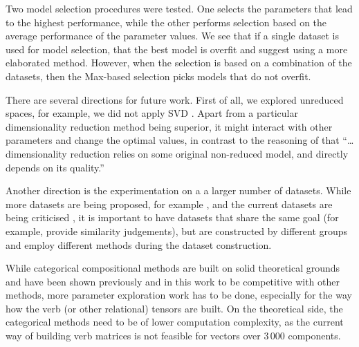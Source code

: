 \documentclass[11pt,a4paper,english,oneside]{book}
\newcommand\newcite\citet
\renewcommand\cite\citep
\begin{document}
Two model selection procedures were tested. One selects the parameters that lead to the highest performance, while the other performs selection based on the average performance of the parameter values. We see that if a single dataset is used for model selection, that the best model is overfit and suggest using a more elaborated method. However, when the selection is based on a combination of the datasets, then the Max-based selection picks models that do not overfit.

There are several directions for future work. First of all, we explored unreduced spaces, for example, we did not apply SVD \cite{BullinariaLevy2012}. Apart from a particular dimensionality reduction method being superior, it might interact with other parameters \cite{lapesa2014large} and change the optimal values, in contrast to the reasoning of \newcite{kiela-clark:2014:CVSC} that ``\ldots dimensionality reduction relies on some original non-reduced model, and directly depends on its quality.''

Another direction is the experimentation on a a larger number of datasets. While more datasets are being proposed, for example \newcite{2016arXiv160800869G}, and the current datasets are being criticised \cite{RepEval:2016}, it is important to have datasets that share the same goal (for example, provide similarity judgements), but are constructed by different groups and employ different methods during the dataset construction.

While categorical compositional methods are built on solid theoretical grounds \cite{DBLP:journals/corr/abs-1003-4394} and have been shown previously \cite{Grefenstette:2011:ETV:2140490.2140497,kartsadrqpl2014,fried-polajnar-clark:2015:ACL-IJCNLP,kim2015neural,hashimoto-tsuruoka:2016:P16-1} and in this work to be competitive with other methods, more parameter exploration work has to be done, especially for the way how the verb (or other relational) tensors are built. On the theoretical side, the categorical methods need to be of lower computation complexity, as the current way of building verb matrices is not feasible for vectors over 3\,000 components.


\cleardoublepage
{
  \pagestyle{bibliography}
  
  
  \thispagestyle{bibliography}
}

\cleardoublepage
\appendix
\end{document}
